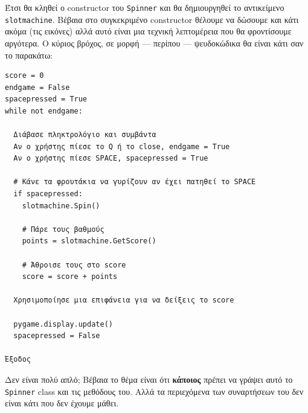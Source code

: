 Έτσι θα κληθεί ο constructor του {\tt Spinner} και θα δημιουργηθεί το
αντικείμενο {\tt slotmachine}. Βέβαια στο συγκεκριμένο constructor θέλουμε να δώσουμε και κάτι ακόμα (τις εικόνες) αλλά αυτό είναι μια τεχνική λεπτομέρεια που θα φροντίσουμε αργότερα. Ο κύριος βρόχος, σε μορφή --- περίπου --- ψευδοκώδικα θα είναι κάτι σαν το παρακάτω:
%
\begin{verbatim}
score = 0
endgame = False
spacepressed = True
while not endgame:

  Διάβασε πληκτρολόγιο και συμβάντα
  Αν ο χρήστης πίεσε το Q ή το close, endgame = True
  Αν ο χρήστης πίεσε SPACE, spacepressed = True

  # Κάνε τα φρουτάκια να γυρίζουν αν έχει πατηθεί το SPACE
  if spacepressed:
    slotmachine.Spin()

    # Πάρε τους βαθμούς
    points = slotmachine.GetScore()

    # Άθροισε τους στο score
    score = score + points

  Χρησιμοποίησε μια επιφάνεια για να δείξεις το score

  pygame.display.update()
  spacepressed = False

Έξοδος
\end{verbatim}
%
Δεν είναι πολύ απλό; Βέβαια το θέμα είναι ότι {\bf κάποιος} πρέπει να γράψει
αυτό το {\tt Spinner} class και τις μεθόδους του. Αλλά τα περιεχόμενα των συναρτήσεων του δεν είναι κάτι που δεν έχουμε μάθει.
%
